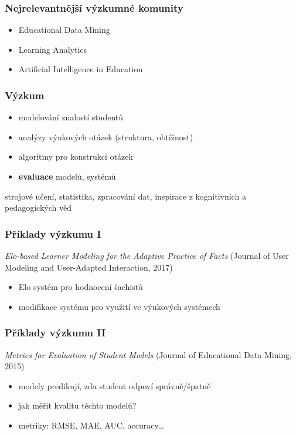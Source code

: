 \documentclass[bigger]{beamer}
\begin{document}
\begin{frame}
  \frametitle{Nejrelevantnější výzkumné komunity}

  \begin{itemize}
  \item Educational Data Mining
  \item Learning Analytics
  \item Artificial Intelligence in Education
  \end{itemize}
\end{frame}

\begin{frame}
  \frametitle{Výzkum}

  \begin{itemize}
  \item modelování znalostí studentů
  \item analýzy výukových otázek (struktura, obtížnost)
  \item algoritmy pro konstrukci otázek
  \item \textbf{evaluace} modelů, systémů
  \end{itemize}

  \bigskip

  strojové učení, statistika, zpracování dat, inspirace z kognitivních a
  pedagogických věd
\end{frame}

\begin{frame}
  \frametitle{Příklady výzkumu I}

  \emph{Elo-based Learner Modeling for the Adaptive Practice of Facts} (Journal
  of User Modeling and User-Adapted Interaction, 2017) 

  \bigskip

  \begin{itemize}
  \item Elo systém pro hodnocení šachistů
  \item modifikace systému pro využití ve výukových systémech
  \end{itemize}
\end{frame}


\begin{frame}
  \frametitle{Příklady výzkumu II}

  \emph{Metrics for Evaluation of Student Models} (Journal of Educational Data
  Mining, 2015)

  \bigskip

  \begin{itemize}
  \item modely predikují, zda student odpoví správně/špatně
  \item jak měřit kvalitu těchto modelů?
  \item metriky: RMSE, MAE, AUC, accuracy\ldots
  \end{itemize}
\end{frame}
\end{document}
